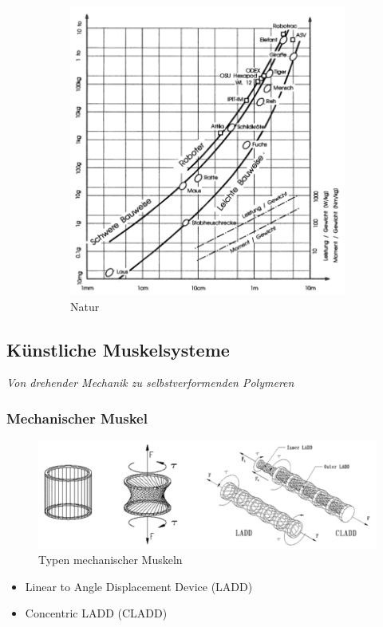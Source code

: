 \begin{figure}[h!]
\begin{subfigure}{.5\textwidth}
		\includegraphics[width=\linewidth]{figures/ch03_klassische-antriebe1.png}
		\caption{Natur}
	\end{subfigure}
	\caption{}
\end{figure}
\newpage
\subsection{Künstliche Muskelsysteme}
\emph{Von drehender Mechanik zu selbstverformenden Polymeren}
\subsubsection{Mechanischer Muskel}
\begin{figure}[h!]
	\centering
	\includegraphics[width=0.6\linewidth]{figures/ch03_mech-muskel.png}
	\caption{Typen mechanischer Muskeln}
	\label{mechmus}
\end{figure}
\begin{itemize}
	\item Linear to Angle Displacement Device (LADD)
	\item Concentric LADD (CLADD)
\end{itemize}
